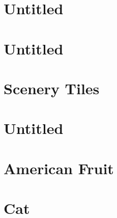 \documentclass[oneside,14pt]{memoir} %
\newcommand{\chapterXXXVIvar}{poem/untitled_14.tex}
\newcommand{\chapterXXXVIIvar}{poem/untitled_15.tex}
\newcommand{\chapterXXXVIIIvar}{poem/scenery_tiles.tex}
\newcommand{\chapterXXXIXvar}{poem/american_fruit.tex}
\newcommand{\chapterXXXXvar}{poem/cat.tex}
\begin{document}
\chapter{Untitled}



\chapter{Untitled}



\chapter{Scenery Tiles}



\chapter{Untitled}



\chapter{American Fruit}



\chapter{Cat}





\end{document}
